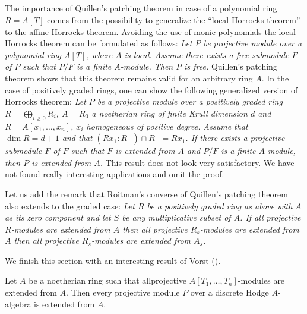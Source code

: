 \subsection{}\label{chap10-sec1.4}
The importance of Quillen's patching theorem in case of a polynomial
ring $R=A[T]$ comes from the possibility to generalize\pageoriginale
the ``local Horrocks theorem'' to the affine Horrocks
theorem. Avoiding the use of monic polynomials the local Horrocks
theorem can be formulated as follows: {\em Let $P$ be projective
module over a polynomial ring $A[T]$, where $A$ is local. Assume there
exists a free submodule $F$ of $P$ such that $P/F$ is a finite
$A$-module. Then $P$ is free.} Quillen's patching theorem shows that
this theorem remains valid for an arbitrary ring $A$. In the case of
positively graded rings, one can show the following generalized
version of Horrocks theorem: {\em Let $P$ be a projective module over
a positively graded ring $R=\bigoplus\limits_{i\geq 0}R_{i}$,
$A=R_{0}$ a noetherian ring of finite Krull dimension $d$ and
$R=A[x_{1},\ldots,x_{n}]$, $x_{i}$ homogeneous of positive
degree. Assume that $\dim R=d+1$ and that $(Rx_{1}:R^{+})\cap
R^{+}=Rx_{1}$. If there exists a projective submodule $F$ of $F$ such
that $F$ is extended from $A$ and $P/F$ is a finite $A$-module, then
$P$ is extended from $A$.} This result does not look very
satisfactory. We have not found really interesting applications and
omit the proof.

Let us add the remark that Roitman's converse of Quillen's patching
theorem also extends to the graded case: {\em Let $R$ be a positively
graded ring as above with $A$ as its zero component and let $S$ be any
multiplicative subset of $A$. If all projective $R$-modules are
extended from $A$ then all projective $R_{s}$-modules are extended
from $A$ then all projective $R_{s}$-modules are extended from
$A_{s}$.}

We finish this section with an interesting result of Vorst
(\cite[Theorem 1.1]{chap10-Vo}).

\setcounter{subprop}{4}
\begin{subthm}[Vorst]\label{chap10-thm1.5}
Let $A$ be a noetherian ring such that all\pageoriginale projective
$A[T_{1},\ldots,T_{n}]$-modules are extended from $A$. Then every
projective module $P$ over a discrete Hodge $A$-algebra is extended
from $A$.
\end{subthm}

